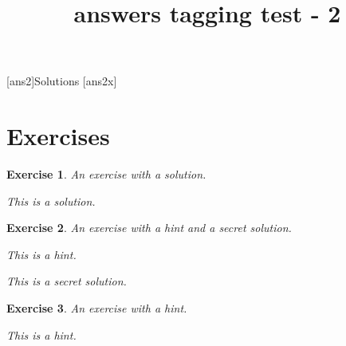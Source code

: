 \documentclass{article}
\title{answers tagging test - 2}
\newtheorem{Exc}{Exercise}
\newenvironment{Ex}{\begin{Exc}\normalfont}{\end{Exc}}
\begin{document}
   [ans2]{Solutions}
   [ans2x]
   \section{Exercises}
   \begin{Ex}
      An exercise with a solution.
      \begin{solution}
         This is a solution.
         \relax{}
      \end{solution}
   \end{Ex}
   \begin{Ex}
      An exercise with a hint and a secret solution.
      \begin{hint}
         This is a hint.
      \end{hint}
      \begin{Solution}
         This is a secret solution.
      \end{Solution}
   \end{Ex}
   \begin{Ex}
      An exercise with a hint.
      \begin{hint}
         This is a hint.
      \end{hint}
   \end{Ex}
   \clearpage
\end{document}
